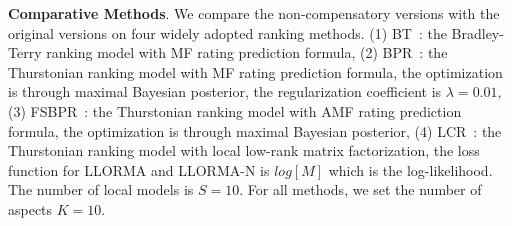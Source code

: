 \documentclass[letterpaper]{article} %
\begin{document}
\textbf{Comparative Methods}. We compare the non-compensatory versions with the original versions on four widely adopted ranking methods. (1) BT~\cite{Hu2016Improved}: the Bradley-Terry ranking model with MF rating prediction formula, (2) BPR~\cite{Rendle2009BPR}:  the Thurstonian ranking model with MF rating prediction formula, the optimization is through maximal Bayesian posterior, the regularization coefficient is $\lambda=0.01$, (3) FSBPR~\cite{Zhao2018Factored}: the Thurstonian ranking model with AMF rating prediction formula, the optimization is through maximal Bayesian posterior, (4) LCR~\cite{Lee2014Local}: the Thurstonian ranking model with local low-rank matrix factorization, the loss function for LLORMA and LLORMA-N is $log[M]$ which is the log-likelihood. The number of local models  is $S=10$.  For all methods, we set the number of aspects $K=10$. 
\end{document}

